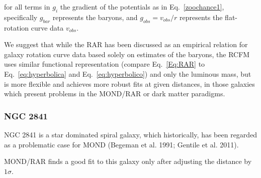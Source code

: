 \documentclass[reprint,%
 amsmath,amssymb,
 aps,
]{revtex4-1}
\begin{document}
for all  terms in $g_i$   the gradient of the potentials as in Eq.~\ref{zoochance1}, specifically 
$ g_{bar}$ represents   the baryons,  and  $g_{obs}= v_{obs}/r$  represents  the flat-rotation curve data $v_{obs}$.  


We   suggest that while the RAR  has been discussed as an empirical relation for galaxy rotation curve data based solely on estimates of the  baryons, 
the RCFM uses similar functional representation   (compare Eq.~\ref{Eq:RAR} to 
Eq.~\ref{eq:hyperbolica} and Eq.~\ref{eq:hyperbolico}) and only the luminous mass, but is more flexible and  achieves more robust fits at given distances,  in   those galaxies which present problems in the MOND/RAR or dark matter paradigms. 
 
 
 
 
 
\subsubsection{NGC 2841}
NGC 2841 is a star dominated spiral galaxy, which   historically, has been regarded as a problematic case for MOND (Begeman
et al. 1991; Gentile et al. 2011). 

MOND/RAR finds a good fit to this galaxy only  after adjusting
the  distance by $1\sigma$.  
\end{document}
